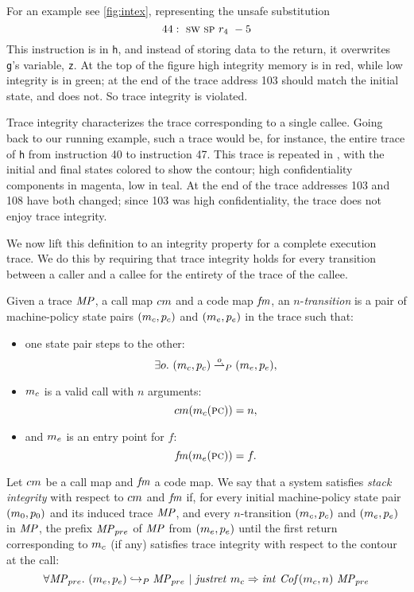 \documentclass[acmsmall,review,anonymous]{acmart}\settopmatter{printfolios=true,printccs=false,printacmref=false}
\begin{document}
For an example see \cref{fig:intex}, representing the unsafe substitution
\[
  44: ~ \textsc{sw} ~ \textsc{sp} ~ r_4 ~ -5
\]
This instruction is in {\tt h}, and instead of storing data to the return,
it overwrites {\tt g}'s variable, {\tt z}. At the top of the figure high
integrity memory is in red, while low integrity is in green; at the end of the
trace address 103 should match the initial state, and does not. So trace
integrity is violated.

Trace integrity characterizes the trace corresponding to a single
callee. Going back to our running example, such a trace would be, for
instance, the entire trace of {\tt h} from instruction 40 to
instruction 47. This trace is repeated in , with the initial
and final states colored to show the contour; high confidentiality
components in magenta, low in teal. At the end of the trace addresses 103
and 108 have both changed; since 103 was high confidentiality, the trace
does not enjoy trace integrity.

We now lift this definition to an integrity property for a complete
execution trace. We do this by requiring that trace integrity holds
for every transition between a caller and a callee for the entirety of
the trace of the callee.

 Given a trace $\mathit{MP}$, a call map $cm$ and
a code map $\mathit{fm}$, an $n$-{\em transition} is a pair of
machine-policy state pairs $(m_c, p_c)$ and $(m_e, p_e)$
in the trace such that:
\begin{itemize}
\item one state pair steps to the other:
  $$\exists o. ~ (m_c, p_c) \overset{o}{\rightharpoonup}_P (m_e, p_e),$$
\item $m_c$ is a valid call with $n$ arguments:
  $$cm(m_c(\textsc{pc})) = n,$$
\item and $m_e$ is an entry point for $f$:
  $$\mathit{fm}(m_e(\textsc{pc})) = f.$$
\end{itemize}

 Let $cm$ be a call map and
$\mathit{fm}$ a code map. We say that a system satisfies {\em stack
  integrity} with respect to $cm$ and $\mathit{fm}$ if, for every
initial machine-policy state pair $(m_0, p_0)$ and its induced
trace $\mathit{MP}$, and every $n$-transition $(m_c, p_c)$ and
$(m_e, p_e)$ in $\mathit{MP}$, the prefix $\mathit{MP}_{pre}$ of $\mathit{MP}$ from
$(m_e, p_e)$ until the first return corresponding to $m_c$
(if any) satisfies trace integrity with respect to the contour at the
call:
%
$$\forall \mathit{MP}_{pre}. ~ (m_e,p_e) \hookrightarrow_P
\mathit{MP}_{pre} ~ | ~ \mathit{justret}\ m_c \Rightarrow
\mathit{int}~\mathit{Cof}(m_c, n)~\mathit{MP}_{pre}$$
\end{document}
